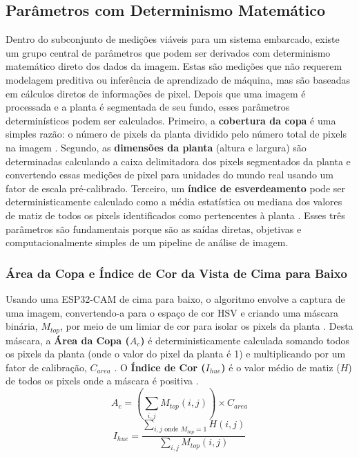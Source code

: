 \documentclass[12pt, a4paper]{article}
\begin{document}
	\subsection{Parâmetros com Determinismo Matemático}
	Dentro do subconjunto de medições viáveis para um sistema embarcado, existe um grupo central de parâmetros que podem ser derivados com determinismo matemático direto dos dados da imagem. Estas são medições que não requerem modelagem preditiva ou inferência de aprendizado de máquina, mas são baseadas em cálculos diretos de informações de pixel. Depois que uma imagem é processada e a planta é segmentada de seu fundo, esses parâmetros determinísticos podem ser calculados. Primeiro, a \textbf{cobertura da copa} é uma simples razão: o número de pixels da planta dividido pelo número total de pixels na imagem \cite{Golzarian2011}. Segundo, as \textbf{dimensões da planta} (altura e largura) são determinadas calculando a caixa delimitadora dos pixels segmentados da planta e convertendo essas medições de pixel para unidades do mundo real usando um fator de escala pré-calibrado. Terceiro, um \textbf{índice de esverdeamento} pode ser deterministicamente calculado como a média estatística ou mediana dos valores de matiz de todos os pixels identificados como pertencentes à planta \cite{Karcher2003}. Esses três parâmetros são fundamentais porque são as saídas diretas, objetivas e computacionalmente simples de um pipeline de análise de imagem.
	
	\subsubsection{Área da Copa e Índice de Cor da Vista de Cima para Baixo}
	Usando uma ESP32-CAM de cima para baixo, o algoritmo envolve a captura de uma imagem, convertendo-a para o espaço de cor HSV e criando uma máscara binária, $M_{top}$, por meio de um limiar de cor para isolar os pixels da planta \cite{Hamuda2016}. Desta máscara, a \textbf{Área da Copa ($A_c$)} é deterministicamente calculada somando todos os pixels da planta (onde o valor do pixel da planta é 1) e multiplicando por um fator de calibração, $C_{area}$ \cite{Golzarian2011}. O \textbf{Índice de Cor ($I_{hue}$)} é o valor médio de matiz ($H$) de todos os pixels onde a máscara é positiva \cite{Karcher2003}.
	\begin{equation}
		A_c = \left( \sum_{i,j} M_{top}(i,j) \right) \times C_{area}
	\end{equation}
	\begin{equation}
		I_{hue} = \frac{\sum_{i,j \text{ onde } M_{top}=1} H(i,j)}{\sum_{i,j} M_{top}(i,j)}
	\end{equation}
	
\end{document}
